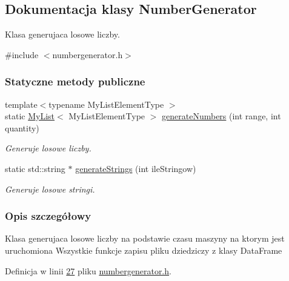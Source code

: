 \hypertarget{class_number_generator}{\subsection{Dokumentacja klasy Number\-Generator}
\label{class_number_generator}
}


Klasa generujaca losowe liczby.  




{\ttfamily \#include $<$numbergenerator.\-h$>$}

\subsubsection*{Statyczne metody publiczne}
\begin{DoxyCompactItemize}
\item 
{\footnotesize template$<$typename My\-List\-Element\-Type $>$ }\\static \hyperlink{class_my_list}{My\-List}$<$ My\-List\-Element\-Type $>$ \hyperlink{class_number_generator_ab3c0d704683453456684ec24fb771334}{generate\-Numbers} (int range, int quantity)
\begin{DoxyCompactList}\small\item\em Generuje losowe liczby. \end{DoxyCompactList}\item 
static std\-::string $\ast$ \hyperlink{class_number_generator_afed5ae8efb72655770753790714b7643}{generate\-Strings} (int ile\-Stringow)
\begin{DoxyCompactList}\small\item\em Generuje losowe stringi. \end{DoxyCompactList}\end{DoxyCompactItemize}


\subsubsection{Opis szczegółowy}
Klasa generujaca losowe liczby na podstawie czasu maszyny na ktorym jest uruchomiona Wszystkie funkcje zapisu pliku dziedziczy z klasy Data\-Frame 

Definicja w linii \hyperlink{numbergenerator_8h_source_l00027}{27} pliku \hyperlink{numbergenerator_8h_source}{numbergenerator.\-h}.



